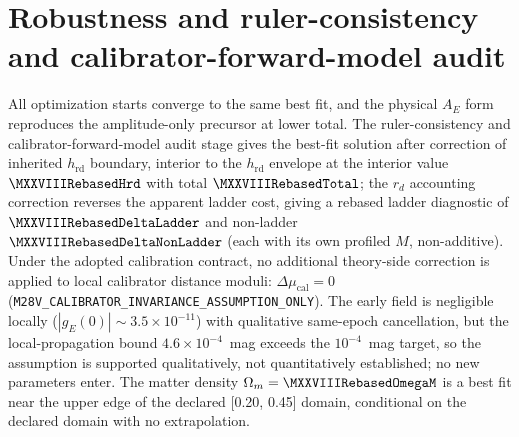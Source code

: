 \section{Robustness and ruler-consistency and calibrator-forward-model audit}
\label{app:robustness}

All optimization starts converge to the same best fit, and the physical
$A_{E}$ form reproduces the amplitude-only precursor at lower total. The
ruler-consistency and calibrator-forward-model audit stage gives the best-fit solution after correction of inherited $h_{\mathrm{rd}}$ boundary,
interior to the $h_{\mathrm{rd}}$ envelope at the interior value
$\MXXVIIIRebasedHrd$ with total $\MXXVIIIRebasedTotal$; the $r_{d}$
accounting correction reverses the apparent ladder cost, giving a
rebased ladder diagnostic of $\MXXVIIIRebasedDeltaLadder$ and non-ladder
$\MXXVIIIRebasedDeltaNonLadder$ (each with its own profiled $M$,
non-additive). Under the adopted calibration contract, no additional
theory-side correction is applied to local calibrator distance moduli:
$\Delta\mu_{\mathrm{cal}}=0$
(\texttt{M28V\_CALIBRATOR\_INVARIANCE\_ASSUMPTION\_ONLY}). The early field is negligible locally
($|g_{E}(0)|\sim3.5\times10^{-11}$) with qualitative same-epoch cancellation,
but the local-propagation bound $4.6\times10^{-4}$~mag exceeds the $10^{-4}$~mag
target, so the assumption is supported qualitatively, not quantitatively
established; no new parameters enter. The matter density
$\Omega_{m} = \MXXVIIIRebasedOmegaM$ is a best fit near the upper edge
of the declared [0.20, 0.45] domain, conditional on the declared domain
with no extrapolation.

\begin{table}[!htbp]
\centering
\caption{Ruler audit: consistent-ruler ladder values with unchanged full
likelihood, plus source-defined ladder and non-ladder diagnostics (each
with its own profiled $M$, non-additive) and calibrator invariance.
This is the only place ladder/non-ladder differences appear.}
\label{tab:m28r1}

\end{table}
